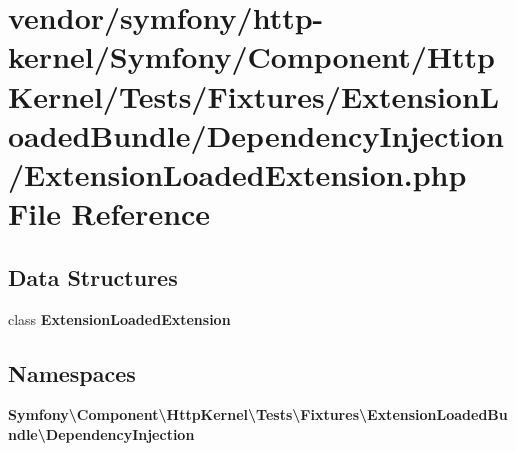 \section{vendor/symfony/http-\/kernel/\+Symfony/\+Component/\+Http\+Kernel/\+Tests/\+Fixtures/\+Extension\+Loaded\+Bundle/\+Dependency\+Injection/\+Extension\+Loaded\+Extension.php File Reference}
\label{_extension_loaded_extension_8php}
\subsection*{Data Structures}
\begin{DoxyCompactItemize}
\item 
class {\bf Extension\+Loaded\+Extension}
\end{DoxyCompactItemize}
\subsection*{Namespaces}
\begin{DoxyCompactItemize}
\item 
 {\bf Symfony\textbackslash{}\+Component\textbackslash{}\+Http\+Kernel\textbackslash{}\+Tests\textbackslash{}\+Fixtures\textbackslash{}\+Extension\+Loaded\+Bundle\textbackslash{}\+Dependency\+Injection}
\end{DoxyCompactItemize}
